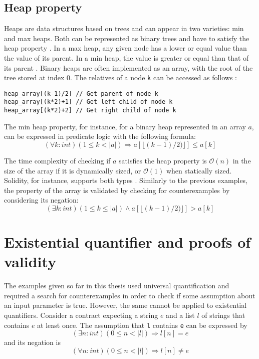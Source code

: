 \subsection{Heap property}
Heaps are data structures based on trees and can appear in two varieties: min and max heaps. Both can be represented as binary trees and have to satisfy the heap property \cite{dict_heap}. In a max heap, any given node has a lower or equal value than the value of its parent. In a min heap, the value is greater or equal than that of its parent \cite{dict_heap_property}. Binary heaps are often implemented as an array, with the root of the tree stored at index 0. The relatives of a node \texttt{k} can be accessed as follows \cite{dict_binary_heap}:
\begin{lstlisting}[language=Solidity, numbers=none, caption=Access a binary heap in array representation]
heap_array[(k-1)/2] // Get parent of node k
heap_array[(k*2)+1] // Get left child of node k
heap_array[(k*2)+2] // Get right child of node k
\end{lstlisting}

The min heap property, for instance, for a binary heap represented in an array $a$, can be expressed in predicate logic with the following formula:
\begin{equation}\label{eq:heap-unversial}
  (\forall k : int) (1 \le k < |a|) \Rightarrow a[\lfloor(k-1)/2)\rfloor] \le a[k]
\end{equation}

The time complexity of checking if $a$ satisfies the heap property is $\mathcal{O}(n)$ in the size of the array if it is dynamically sized, or $\mathcal{O}(1)$ when statically sized. Solidity, for instance, supports both types \cite{solidity_docs}. Similarly to the previous examples, the property of the array is validated by checking for counterexamples by considering its negation:
\begin{equation}\label{eq:heap-unversial-neg}
  (\exists k : int) (1 \le k \le |a|) \land a[\lfloor(k-1)/2)\rfloor] > a[k]
\end{equation}

\section{Existential quantifier and proofs of validity}
The examples given so far in this thesis used universal quantification and required a search for counterexamples in order to check if some assumption about an input parameter is true. However, the same cannot be applied to existential quantifiers. Consider a contract expecting a string $e$ and a list $l$ of strings that contains $e$ at least once. The assumption that \texttt{l} contains \texttt{e} can be expressed by
\begin{equation}\label{eq:contains}
	(\exists n : int) (0 \leq n < |l|) \Rightarrow l[n] = e
\end{equation}
and its negation is 
\begin{equation}\label{eq:contains_neg}
	(\forall n : int) (0 \leq n < |l|) \Rightarrow l[n] \ne e
\end{equation}

